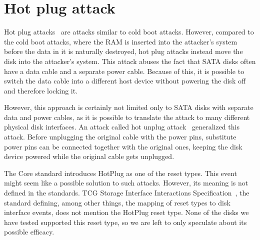 \section{Hot plug attack}

Hot plug attacks~\cite{self_decrypting_risks} are attacks similar to cold boot attacks. However, compared to the cold boot attacks, where the RAM is inserted into the attacker's system before the data in it is naturally destroyed, hot plug attacks instead move the disk into the attacker's system. This attack abuses the fact that SATA disks often have a data cable and a separate power cable. Because of this, it is possible to switch the data cable into a different host device without powering the disk off and therefore locking it. 

However, this approach is certainly not limited only to SATA disks with separate data and power cables, as it is possible to translate the attack to many different physical disk interfaces. An attack called hot unplug attack~\cite{bypassing_in_enterprise} generalized this attack. 
Before unplugging the original cable with the power pins, substitute power pins can be connected together with the original ones, keeping the disk device powered while the original cable gets unplugged. 


\REPLACEME

The Core standard introduces HotPlug as one of the reset types. This event might seem like a possible solution to such attacks. However,  its meaning is not defined in the standards. TCG Storage Interface Interactions Specification~\cite{tcg-siis}, the standard defining, among other things, the mapping of reset types to disk interface events, does not mention the HotPlug reset type. None of the disks we have tested supported this reset type, so we are left to only speculate about its possible efficacy.





